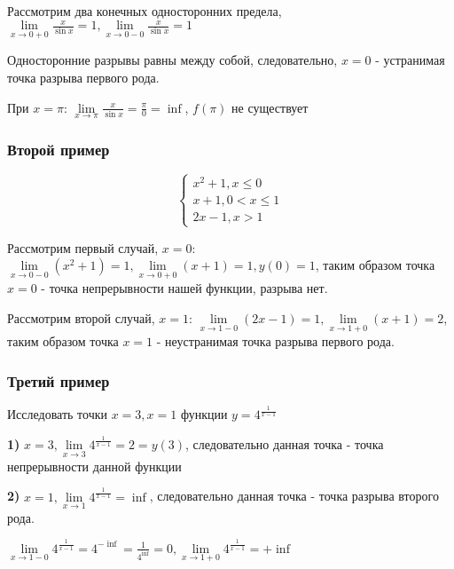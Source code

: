 \documentclass{article}
\begin{document}
Рассмотрим два конечных односторонних предела, $\lim\limits_{x \to 0 + 0} \frac{x}{\sin x} = 1, \lim\limits_{x \to 0 - 0} \frac{x}{\sin x} = 1$

Односторонние разрывы равны между собой, следовательно, $x = 0$ - устранимая точка разрыва первого рода.

При $x = \pi$: $\lim\limits_{x \to \pi} \frac{x}{\sin x} = \frac{\pi}{0} = \inf$, $f(\pi)$ не существует

\subsubsection{Второй пример}

\begin{equation}
    \begin{cases}
        x^2 + 1, x \le 0 \\
        x + 1, 0 < x \le 1 \\
        2x - 1, x > 1
    \end{cases}
\end{equation}

Рассмотрим первый случай, $x = 0$: $\lim\limits_{x \to 0 - 0} (x^2 + 1) = 1, \lim\limits_{x \to 0 + 0} (x + 1) = 1, y(0) = 1$, таким образом точка $x = 0$ - точка непрерывности нашей функции, разрыва нет.

Рассмотрим второй случай, $x = 1$: $\lim\limits_{x \to 1 - 0} (2x - 1) = 1, \lim\limits_{x \to 1 + 0} (x + 1) = 2$, таким образом точка $x = 1$ - неустранимая точка разрыва первого рода.

\subsubsection{Третий пример}

Исследовать точки $x = 3, x = 1$ функции $y = 4^\frac{1}{x - 1}$

\textbf{1)} $x = 3, \lim\limits_{x \to 3} 4^\frac{1}{x - 1} = 2 = y(3)$, следовательно данная точка - точка непрерывности данной функции

\textbf{2)} $x = 1, \lim\limits_{x \to 1} 4^\frac{1}{x - 1} = \inf$, следовательно данная точка - точка разрыва второго рода.

$\lim\limits_{x \to 1 - 0} 4^{\frac{1}{x - 1}} = 4^{-\inf} = \frac{1}{4^{\inf}} = 0, \lim\limits_{x \to 1 + 0} 4^\frac{1}{x - 1} = +\inf$
\end{document}

